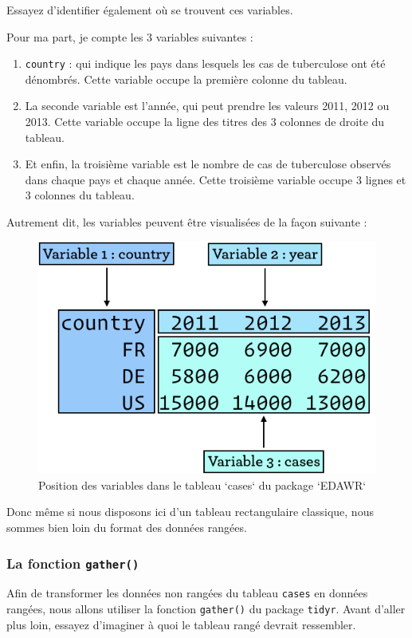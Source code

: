 \documentclass[a4paperpaper,]{article}
\providecommand{\tightlist}{%
  \setlength{\itemsep}{0pt}\setlength{\parskip}{0pt}}
\begin{document}
Essayez d'identifier également où se trouvent ces variables.

Pour ma part, je compte les 3 variables suivantes :

\begin{enumerate}
\def\labelenumi{\arabic{enumi}.}
\tightlist
\item
  \texttt{country} : qui indique les pays dans lesquels les cas de tuberculose ont été dénombrés. Cette variable occupe la première colonne du tableau.
\item
  La seconde variable est l'année, qui peut prendre les valeurs 2011, 2012 ou 2013. Cette variable occupe la ligne des titres des 3 colonnes de droite du tableau.
\item
  Et enfin, la troisième variable est le nombre de cas de tuberculose observés dans chaque pays et chaque année. Cette troisième variable occupe 3 lignes et 3 colonnes du tableau.
\end{enumerate}

Autrement dit, les variables peuvent être visualisées de la façon suivante :

\begin{figure}[htpb]

{\centering \includegraphics[width=0.5\linewidth]{images/gather} 

}

\caption{Position des variables dans le tableau `cases` du package `EDAWR`}\label{fig:gather}
\end{figure}

Donc même si nous disposons ici d'un tableau rectangulaire classique, nous sommes bien loin du format des données rangées.

\hypertarget{la-fonction-gather}{%
\subsubsection{\texorpdfstring{La fonction \texttt{gather()}}{La fonction gather()}}\label{la-fonction-gather}}

Afin de transformer les données non rangées du tableau \texttt{cases} en données rangées, nous allons utiliser la fonction \texttt{gather()} du package \texttt{tidyr}. Avant d'aller plus loin, essayez d'imaginer à quoi le tableau rangé devrait ressembler.
\end{document}
